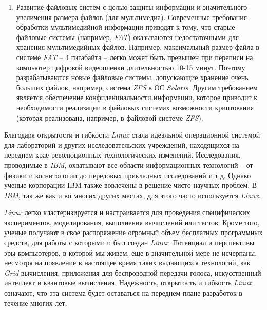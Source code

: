 \begin{enumerate}
	\item Развитие файловых систем с целью защиты информации и значительного увеличения размера файлов (для мультимедиа). Современные требования обработки мультимедийной информации приводят к тому, что старые файловые системы (например, \textit{FAT}) оказываются недостаточными для хранения мультимедийных файлов. Например, максимальный размер файла в системе \textit{FAT} – 4 гигабайта – легко может быть превышен при переписи на компьютер цифровой видеопленки длительностью 10-15 минут. Поэтому разрабатываются новые файловые системы, допускающие хранение очень больших файлов, например, система \textit{ZFS} в ОС \textit{Solaris}. Другим требованием является обеспечение конфиденциальности информации, которое приводит к необходимости реализации в файловых системах возможности криптования (которая реализована, например, в файловой системе \textit{ZFS}).
\end{enumerate}

Благодаря открытости и гибкости \textit{Linux} стала идеальной операционной системой для лабораторий и других исследовательских учреждений, находящихся на переднем крае революционных технологических изменений.  Исследования, проводимые в \textit{IBM}, охватывают все области информационных технологий – от физики и когнитологии до передовых прикладных исследований и т.д. Однако ученые корпорации IBM также вовлечены в решение чисто научных проблем.  В \textit{IBM}, так же как и во многих других местах, для этого часто используется \textit{Linux}.

\textit{Linux} легко кластеризируется и настраивается для проведения специфических экспериментов, моделирования, выполнения вычислений или тестов. Кроме того, ученые получают в свое распоряжение огромный объем бесплатных программных средств, для работы с которыми и был создан \textit{Linux}.   Потенциал и перспективы эры компьютеров, в которой мы живем, еще в значительной мере не исчерпаны, несмотря на появление в настоящее время таких выдающихся технологий, как \textit{Grid}-вычисления, приложения для беспроводной передачи голоса, искусственный интеллект и квантовые вычисления. Надежность, открытость и гибкость \textit{Linux} означают, что эта система будет оставаться на переднем плане разработок в течение многих лет.
